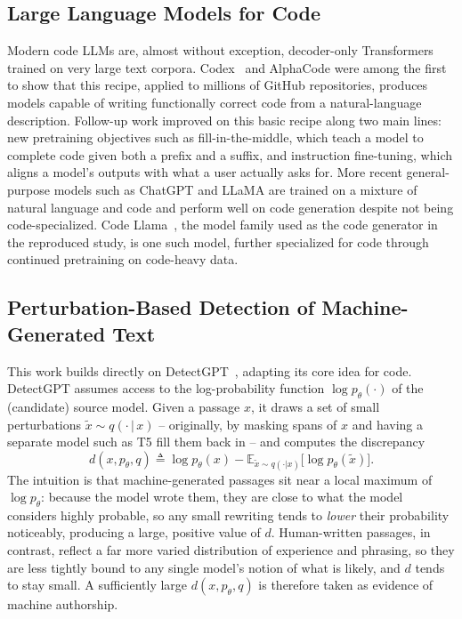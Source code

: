 \documentclass[manuscript,review]{acmart}
\begin{document}
\subsection{Large Language Models for Code}
Modern code LLMs are, almost without exception, decoder-only Transformers~\cite{vaswani2017attention} trained on very large text corpora. Codex~\cite{chen2021evaluating} and AlphaCode were among the first to show that this recipe, applied to millions of GitHub repositories, produces models capable of writing functionally correct code from a natural-language description. Follow-up work improved on this basic recipe along two main lines: new pretraining objectives such as fill-in-the-middle, which teach a model to complete code given both a prefix and a suffix, and instruction fine-tuning, which aligns a model's outputs with what a user actually asks for. More recent general-purpose models such as ChatGPT and LLaMA are trained on a mixture of natural language and code and perform well on code generation despite not being code-specialized. Code Llama~\cite{roziere2023codellama}, the model family used as the code generator in the reproduced study, is one such model, further specialized for code through continued pretraining on code-heavy data.

\subsection{Perturbation-Based Detection of Machine-Generated Text}
This work builds directly on DetectGPT~\cite{mitchell2023detectgpt}, adapting its core idea for code. DetectGPT assumes access to the log-probability function $\log p_\theta(\cdot)$ of the (candidate) source model. Given a passage $x$, it draws a set of small perturbations $\tilde{x} \sim q(\cdot\,|\,x)$ -- originally, by masking spans of $x$ and having a separate model such as T5 fill them back in -- and computes the discrepancy
\begin{equation}
d(x, p_\theta, q) \triangleq \log p_\theta(x) - \mathbb{E}_{\tilde{x}\sim q(\cdot|x)}\big[\log p_\theta(\tilde{x})\big].
\label{eq:detectgpt}
\end{equation}
The intuition is that machine-generated passages sit near a local maximum of $\log p_\theta$: because the model wrote them, they are close to what the model considers highly probable, so any small rewriting tends to \emph{lower} their probability noticeably, producing a large, positive value of $d$. Human-written passages, in contrast, reflect a far more varied distribution of experience and phrasing, so they are less tightly bound to any single model's notion of what is likely, and $d$ tends to stay small. A sufficiently large $d(x,p_\theta,q)$ is therefore taken as evidence of machine authorship.
\end{document}

